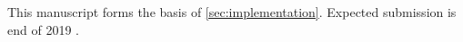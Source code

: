 This manuscript forms the basis of \cref{sec:implementation}. Expected submission is end of 2019 \citep{Denker_elephant_2019}.



\hypersetup{pageanchor=true} %
